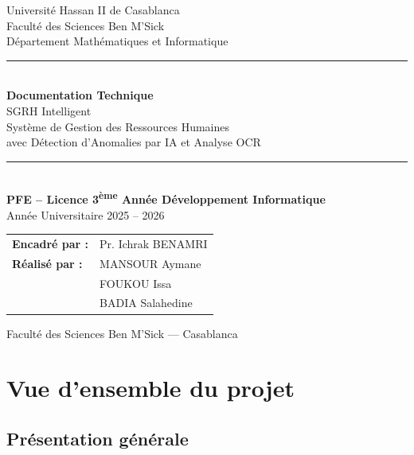 \documentclass[a4paper,12pt]{report}
\begin{document}
\begin{titlepage}
\centering
\vspace*{2cm}

{\Large Université Hassan II de Casablanca}\\[0.3cm]
{\large Faculté des Sciences Ben M'Sick}\\[0.3cm]
{\large Département Mathématiques et Informatique}\\[2cm]

\rule{\textwidth}{1.5pt}\\[0.5cm]
{\Huge\bfseries\textcolor{primary}{Documentation Technique}}\\[0.3cm]
{\LARGE\textcolor{primary}{SGRH Intelligent}}\\[0.2cm]
{\large Système de Gestion des Ressources Humaines\\avec Détection d'Anomalies par IA et Analyse OCR}\\[0.3cm]
\rule{\textwidth}{1.5pt}\\[2cm]

{\large\textbf{PFE -- Licence 3\textsuperscript{ème} Année Développement Informatique}}\\[0.3cm]
{\large Année Universitaire 2025 -- 2026}\\[2cm]

\begin{tabular}{ll}
\textbf{Encadré par :} & Pr. Ichrak BENAMRI \\[0.3cm]
\textbf{Réalisé par :} & MANSOUR Aymane \\
                        & FOUKOU Issa \\
                        & BADIA Salahedine \\
\end{tabular}

\vfill
{\small Faculté des Sciences Ben M'Sick --- Casablanca}
\end{titlepage}

\tableofcontents
\newpage

\chapter{Vue d'ensemble du projet}

\section{Présentation générale}
\end{document}
